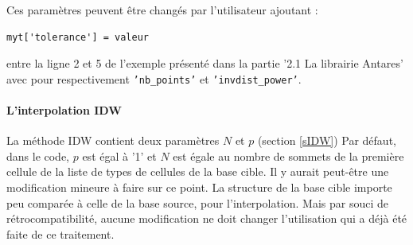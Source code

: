 Ces paramètres peuvent être changés par l'utilisateur ajoutant :
\begin{lstlisting}[]
    myt['tolerance'] = valeur
\end{lstlisting}
entre la ligne 2 et 5 de l'exemple présenté dans la partie '2.1 La librairie Antares' avec pour respectivement \texttt{'nb\_points'} et \texttt{'invdist\_power'}.\label{parametres}

\label{implementation_IDW}\paragraph{L'interpolation IDW}

La méthode IDW contient deux paramètres \(N\) et \(p\) (section \ref{sIDW})
Par défaut, dans le code, \(p\) est égal à '1' et \(N\) est égale au nombre de sommets de la première cellule de la liste de types de cellules de la base cible. Il y aurait peut-être une modification mineure à faire sur ce point. La structure de la base cible importe peu comparée à celle de la base source, pour l'interpolation. Mais par souci de rétrocompatibilité, aucune modification ne doit changer l'utilisation qui a déjà été faite de ce traitement. %


\vspace{0,5cm}

